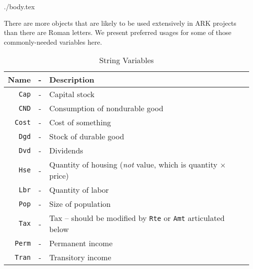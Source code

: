 \documentclass{econtex}
\begin{document}
\begin{verbatimwrite}{./body.tex}

There are more objects that are likely to be used extensively in ARK projects than there are Roman letters.  We present preferred usages for some of those commonly-needed variables here.

\begin{table}[h]
\begin{center}
\begin{tabular}{||rcl||}
\hline
Name & - & Description 
 \\ \hline
     \texttt{Cap}  & - &  Capital stock
\\   \texttt{CND}    & - & Consumption of nondurable good 
 \\  \texttt{Cost}    & - & Cost of something 
 \\  \texttt{Dgd}    & - & Stock of durable good
 \\  \texttt{Dvd}    & - & Dividends 
 \\  \texttt{Hse}    & - & Quantity of housing ({\it not} value, which is quantity $\times$ price)
 \\  \texttt{Lbr}    & - & Quantity of labor
 \\  \texttt{Pop}    & - & Size of population
 \\  \texttt{Tax} & - & Tax -- should be modified by \texttt{Rte} or \texttt{Amt} articulated below
 \\  \texttt{Perm}   & - & Permanent income
 \\  \texttt{Tran}   & - & Transitory income
\\ \hline
\end{tabular}
\caption{String Variables}
\label{table:Strings}
\end{center}
\end{table}

\end{verbatimwrite}

\end{document}
